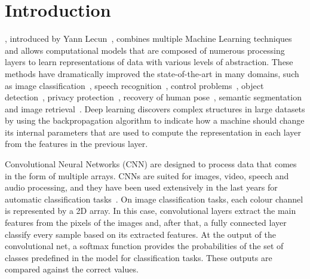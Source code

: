 \documentclass[journal]{IEEEtran}
\begin{document}
	\section{Introduction}
	\label{sect:introduction}
	, introduced by Yann Lecun~\cite{lecun2015deep}, combines multiple Machine Learning techniques and allows computational models that are composed of numerous processing layers to learn representations of data with various levels of abstraction. These methods have dramatically improved the state-of-the-art in many domains, such as image classification~\cite{cirecsan2012multi,he2016deep,krizhevsky2012imagenet}, speech recognition~\cite{hinton2012deep}, control problems~\cite{mnih2015human}, object detection~\cite{jiang2016speed,girshick2014rich}, privacy protection~\cite{yu2017iprivacy}, recovery of human pose~\cite{hong2015multimodal}, semantic segmentation~\cite{long2015fully} and image retrieval~\cite{li2015weakly}. Deep learning discovers complex structures in large datasets by using the backpropagation algorithm to indicate how a machine should change its internal parameters that are used to compute the representation in each layer from the features in the previous layer.
	
	Convolutional Neural Networks (CNN) are designed to process data that comes in the form of multiple arrays. CNNs are suited for images, video, speech and audio processing, and they have been used extensively in the last years for automatic classification tasks~\cite{dong2014learning,sun2013deep,ronneberger2015u}. On image classification tasks, each colour channel is represented by a 2D array. In this case, convolutional layers extract the main features from the pixels of the images and, after that, a fully connected layer classify every sample based on its extracted features. At the output of the convolutional net, a softmax function provides the probabilities of the set of classes predefined in the model for classification tasks. These outputs are compared against the correct values.
	
\end{document}
